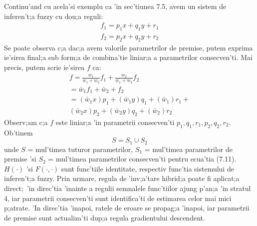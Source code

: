 Continu'and cu acela'si exemplu ca 'in sec'tiunea 7.5, avem un sistem de inferen't;a fuzzy cu dou;a reguli:
\begin{equation}
\begin{aligned}
f_{1} = p_{1}x + q_{1}y + r_{1} \\
f_{2} = p_{2}x + q_{2}y + r_{2}
\end{aligned}
\end{equation}
Se poate observa c;a dac;a avem valorile parametrilor de premise, putem exprima ie'sirea final;a sub form;a de combina'tie liniar;a a parametrilor consecven'ti. Mai precis, putem scrie ie'sirea $f$ ca:
\begin{equation}
\begin{aligned}
f = \frac {w_{1}} {w_{1} + w_{2}} f_{1} + \frac {w_{2}} {w_{1} + w_{2}} f_{2} \\
  = \bar w_{1}f_{1} + \bar w_{2} + f_{2} \\
  = (\bar w_{1}x)p_{1} + (\bar w_{1}y)q_{1} + (\bar w_{1})r_{1} + \\(\bar w_{2}x)p_{2} + (\bar w_{2}y)q_{2} + (\bar w_{2})r_{2}
\end{aligned}
\end{equation}
Observ;am c;a $f$ este liniar;a 'in parametrii consecven'ti $p_{1}, q_{1}, r_{1}, p_{2}, q_{2}, r_{2}$. Ob'tinem
\begin{equation}
S = S_{1} \cup S_{2}
\end{equation}
unde $S$ = mul'timea tuturor parametrilor, $S_{1}$ = mul'timea parametrilor de premise 'si $S_{2}$ = mul'timea parametrilor consecven'ti pentru ecua'tia (7.11). $H(\cdot)$ 'si $F(\cdot, \cdot)$ sunt func'tiile identitate, respectiv func'tia sistemului de inferen't;a fuzzy. Prin urmare, regula de 'inv;a'tare hibrid;a poate fi aplicat;a direct;\ 'in direc'tia 'inainte a regulii semnalele func'tiilor ajung p'an;a 'in stratul 4, iar parametrii consecven'ti sunt identifica'ti de estimarea celor mai mici p;atrate. 'In direc'tia 'inapoi, ratele de eroare se propag;a 'inapoi, iar parametrii de premise sunt actualiza'ti dup;a regula gradientului descendent.













